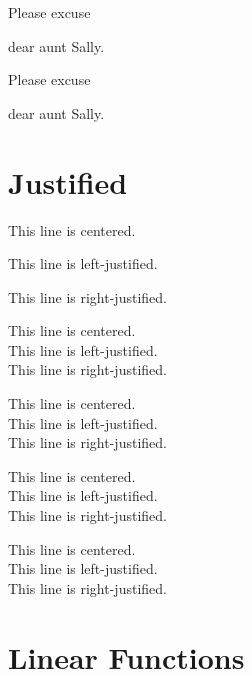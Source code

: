 \documentclass[11pt]{article}
\begin{document}
Please excuse \begin{scriptsize} dear aunt Sally. \end{scriptsize}

Please excuse \begin{tiny} dear aunt Sally. \end{tiny}




\section{Justified}

\begin{center}
This line is centered. 
\end{center}


\begin{flushleft}
This line is left-justified. 
\end{flushleft}

\begin{flushright}
This line is right-justified. 
\end{flushright}


\centering
This line is centered. \\
This line is left-justified. \\
This line is right-justified. 

\vspace{1cm}

\LARGE
This line is centered. \\
This line is left-justified. \\
This line is right-justified. 

\vspace{1cm}

\flushright \normalsize
This line is centered. \\
This line is left-justified. \\
This line is right-justified. 

\vspace{1cm}

\flushleft \tiny
This line is centered. \\
This line is left-justified. \\
This line is right-justified. 

\vspace{1cm}


\section{Linear Functions}
\end{document}
